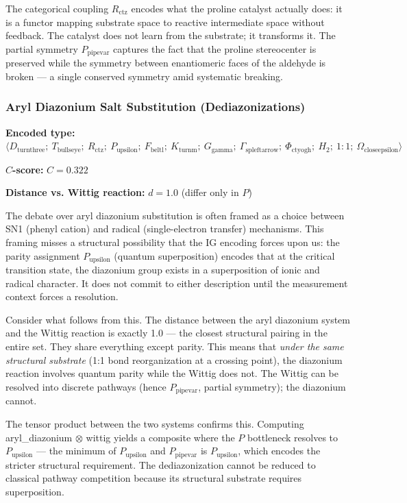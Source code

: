 \documentclass[12pt,a4paper]{article}
\begin{document}
The categorical coupling $R_{\text{ctz}}$ encodes what the proline catalyst actually does: it is a functor mapping substrate space to reactive intermediate space without feedback. The catalyst does not learn from the substrate; it transforms it. The partial symmetry $P_{\text{pipevar}}$ captures the fact that the proline stereocenter is preserved while the symmetry between enantiomeric faces of the aldehyde is broken --- a single conserved symmetry amid systematic breaking.

\subsubsection{Aryl Diazonium Salt Substitution (Dediazonizations)}

\textbf{Encoded type:} $\langle D_{\text{turnthree}};\ T_{\text{bullseye}};\ R_{\text{ctz}};\ P_{\text{upsilon}};\ F_{\text{beltl}};\ K_{\text{turnm}};\ G_{\text{gamma}};\ \Gamma_{\text{spleftarrow}};\ \Phi_{\text{ctyogh}};\ H_2;\ 1{:}1;\ \Omega_{\text{closeepsilon}} \rangle$

\textbf{$C$-score:} $C = 0.322$

\textbf{Distance vs. Wittig reaction:} $d = 1.0$ (differ only in $P$)

The debate over aryl diazonium substitution is often framed as a choice between SN1 (phenyl cation) and radical (single-electron transfer) mechanisms. This framing misses a structural possibility that the IG encoding forces upon us: the parity assignment $P_{\text{upsilon}}$ (quantum superposition) encodes that at the critical transition state, the diazonium group exists in a superposition of ionic and radical character. It does not commit to either description until the measurement context forces a resolution.

Consider what follows from this. The distance between the aryl diazonium system and the Wittig reaction is exactly 1.0 --- the closest structural pairing in the entire set. They share everything except parity. This means that \emph{under the same structural substrate} (1:1 bond reorganization at a crossing point), the diazonium reaction involves quantum parity while the Wittig does not. The Wittig can be resolved into discrete pathways (hence $P_{\text{pipevar}}$, partial symmetry); the diazonium cannot.

The tensor product between the two systems confirms this. Computing aryl\_diazonium $\otimes$ wittig yields a composite where the $P$ bottleneck resolves to $P_{\text{upsilon}}$ --- the minimum of $P_{\text{upsilon}}$ and $P_{\text{pipevar}}$ is $P_{\text{upsilon}}$, which encodes the stricter structural requirement. The dediazonization cannot be reduced to classical pathway competition because its structural substrate requires superposition.
\end{document}
